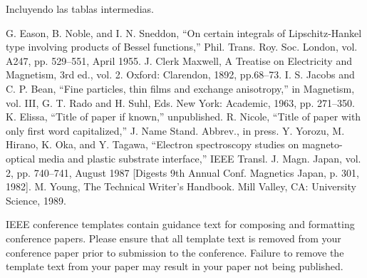 \documentclass[conference]{IEEEtran}
\begin{document}
Incluyendo las tablas intermedias.

\begin{thebibliography}{00}
 G. Eason, B. Noble, and I. N. Sneddon, ``On certain integrals of Lipschitz-Hankel type involving products of Bessel functions,'' Phil. Trans. Roy. Soc. London, vol. A247, pp. 529--551, April 1955.
 J. Clerk Maxwell, A Treatise on Electricity and Magnetism, 3rd ed., vol. 2. Oxford: Clarendon, 1892, pp.68--73.
 I. S. Jacobs and C. P. Bean, ``Fine particles, thin films and exchange anisotropy,'' in Magnetism, vol. III, G. T. Rado and H. Suhl, Eds. New York: Academic, 1963, pp. 271--350.
 K. Elissa, ``Title of paper if known,'' unpublished.
 R. Nicole, ``Title of paper with only first word capitalized,'' J. Name Stand. Abbrev., in press.
 Y. Yorozu, M. Hirano, K. Oka, and Y. Tagawa, ``Electron spectroscopy studies on magneto-optical media and plastic substrate interface,'' IEEE Transl. J. Magn. Japan, vol. 2, pp. 740--741, August 1987 [Digests 9th Annual Conf. Magnetics Japan, p. 301, 1982].
 M. Young, The Technical Writer's Handbook. Mill Valley, CA: University Science, 1989.
\end{thebibliography}
\vspace{12pt}
\color{red}
IEEE conference templates contain guidance text for composing and formatting conference papers. Please ensure that all template text is removed from your conference paper prior to submission to the conference. Failure to remove the template text from your paper may result in your paper not being published.
\end{document}
